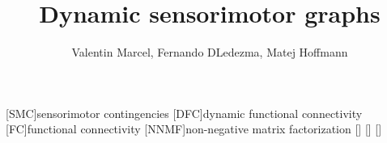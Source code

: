 \usepackage{afterpage}
\usepackage{algorithm}
\usepackage[]{algpseudocode}

\usepackage{stix}
\usepackage{amssymb}
\usepackage{amsmath}

\DeclareMathAlphabet{}

\usepackage{arydshln}
\usepackage[english]{babel}
\usepackage{bm}
\usepackage{caption}
\usepackage[T1]{fontenc}
\usepackage[]{graphicx}
\graphicspath{ {./fig/} }

\usepackage[utf8]{inputenc}
\usepackage{multicol}
\usepackage[T1]{xcolor}
\usepackage{soul}
\usepackage{subfig}
\usepackage{tikz}
\usepackage{url}
\usepackage[backend=biber,style=ieee,sorting=none]{biblatex}


\newcommand{\trsp}{{^{\top}}}

\newcommand\blankpage{%
    \null
    \thispagestyle{empty}%
    \addtocounter{page}{-1}%
    \newpage}



\newcommand*{\important}[1]{\textcolor{red}{\danger~\textbf{IMPORTANT:~}} \textcolor{red}{#1}}

\newcommand*{\pending}[1]{\textcolor{blue}{$\bigstar$~\textbf{PENDING~#1}}}

\newcommand\mybox[2][]{\tikz[overlay]\node[fill=blue!100,inner sep=4pt, anchor=text, rectangle, rounded corners=1mm,#1] {#2};\phantom{#2}}

\newcommand{\TODO}{\mybox[fill=yellow]{\textcolor{blue}{\Large \textbf{TODO}}}}
\newcommand\myhl[1]{\textcolor{red}{#1}}


\newtheorem{prop}{Proposition}

\usepackage[nolist]{acronym}
[SMC]{sensorimotor contingencies}
[DFC]{dynamic functional connectivity}
[FC]{functional connectivity}
[NNMF]{non-negative matrix factorization}
\newacro{}[]{}
\newacro{}[]{}
\newacro{}[]{}

\title{\LARGE \bf
Dynamic sensorimotor graphs
}


\author{Valentin Marcel, Fernando D Ledezma, Matej Hoffmann}



\maketitle

